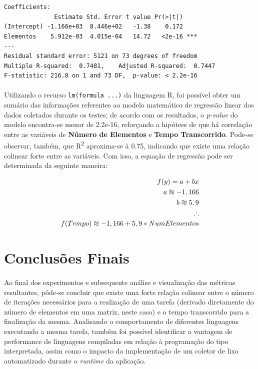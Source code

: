 \documentclass[11pt]{article}
\newcommand*{\approxident}{%
  \mathrel{\vcenter{\offinterlineskip
  \hbox{$\sim$}\vskip-.35ex\hbox{$\sim$}\vskip-.35ex\hbox{$\sim$}}}}
\begin{document}
\begin{verbatim}
Coefficients:
              Estimate Std. Error t value Pr(>|t|)
(Intercept) -1.166e+03  8.446e+02   -1.38    0.172
Elementos    5.912e-03  4.015e-04   14.72   <2e-16 ***
---
Residual standard error: 5121 on 73 degrees of freedom
Multiple R-squared:  0.7481,    Adjusted R-squared:  0.7447 
F-statistic: 216.8 on 1 and 73 DF,  p-value: < 2.2e-16
\end{verbatim}

\paragraph{}
Utilizando o recurso \texttt{lm(formula ...)} da linguagem R, foi possível obter
um sumário das informações referentes ao modelo matemático de regressão linear
dos dados coletados durante os testes; de acordo com os resultados, o
\textit{p-value} do modelo encontra-se menor de 2.2e-16, reforçando a hipótese
de que há correlação entre as variáveis de \textbf{Número de Elementos} e
\textbf{Tempo Transcorrido}. Pode-se observar, também, que R\textsuperscript{2}
aproxima-se à 0.75, indicando que existe uma relação colinear forte entre as
variáveis. Com isso, a equação de regressão pode ser determinada da seguinte
maneira:

\begin{eqnarray*}
     f(y) = a + bx \\
     a \approxident -1,166 \\
     b \approxident 5,9 \\
     \therefore \\
     f(Tempo) \approxident -1,166 + 5,9 * NumElementos
\end{eqnarray*}

\newpage
\section{Conclusões Finais}
\paragraph{}
Ao final dos experimentos e subsequente análise e visualização das métricas
resultantes, pôde-se concluir que existe uma forte relação colinear entre o
número de iterações necessários para a realização de uma tarefa (derivado
diretamente do número de elementos em uma matriz, neste caso) e o tempo
transcorrido para a finalização da mesma. Analisando o comportamento de
diferentes linguagens executando a mesma tarefa, também foi possível identificar
a vantagem de performance de linguagens compiladas em relação à programação do
tipo interpretada, assim como o impacto da implementação de um coletor de lixo
automatizado durante o \textit{runtime} da aplicação.
\end{document}
